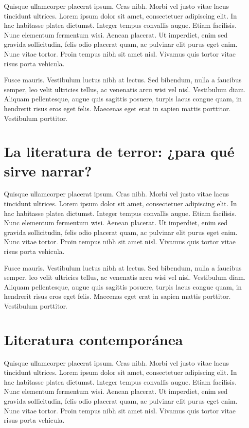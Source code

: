 Quisque ullamcorper placerat ipsum. Cras nibh. Morbi vel justo vitae lacus tincidunt ultrices. Lorem ipsum dolor sit amet, consectetuer adipiscing elit. In hac habitasse platea dictumst. Integer tempus convallis augue. Etiam facilisis. Nunc elementum fermentum wisi. Aenean placerat. Ut imperdiet, enim sed gravida sollicitudin, felis odio placerat quam, ac pulvinar elit purus eget enim. Nunc vitae tortor. Proin tempus nibh sit amet nisl. Vivamus quis tortor vitae risus porta vehicula.

Fusce mauris. Vestibulum luctus nibh at lectus. Sed bibendum, nulla a faucibus semper, leo velit ultricies tellus, ac venenatis arcu wisi vel nisl. Vestibulum diam. Aliquam pellentesque, augue quis sagittis posuere, turpis lacus congue quam, in hendrerit risus eros eget felis. Maecenas eget erat in sapien mattis porttitor. Vestibulum porttitor.

\section{La literatura de terror: ¿para qué sirve narrar?}

Quisque ullamcorper placerat ipsum. Cras nibh. Morbi vel justo vitae lacus tincidunt ultrices. Lorem ipsum dolor sit amet, consectetuer adipiscing elit. In hac habitasse platea dictumst. Integer tempus convallis augue. Etiam facilisis. Nunc elementum fermentum wisi. Aenean placerat. Ut imperdiet, enim sed gravida sollicitudin, felis odio placerat quam, ac pulvinar elit purus eget enim. Nunc vitae tortor. Proin tempus nibh sit amet nisl. Vivamus quis tortor vitae risus porta vehicula.

Fusce mauris. Vestibulum luctus nibh at lectus. Sed bibendum, nulla a faucibus semper, leo velit ultricies tellus, ac venenatis arcu wisi vel nisl. Vestibulum diam. Aliquam pellentesque, augue quis sagittis posuere, turpis lacus congue quam, in hendrerit risus eros eget felis. Maecenas eget erat in sapien mattis porttitor. Vestibulum porttitor.

\section{Literatura contemporánea}

Quisque ullamcorper placerat ipsum. Cras nibh. Morbi vel justo vitae lacus tincidunt ultrices. Lorem ipsum dolor sit amet, consectetuer adipiscing elit. In hac habitasse platea dictumst. Integer tempus convallis augue. Etiam facilisis. Nunc elementum fermentum wisi. Aenean placerat. Ut imperdiet, enim sed gravida sollicitudin, felis odio placerat quam, ac pulvinar elit purus eget enim. Nunc vitae tortor. Proin tempus nibh sit amet nisl. Vivamus quis tortor vitae risus porta vehicula.

